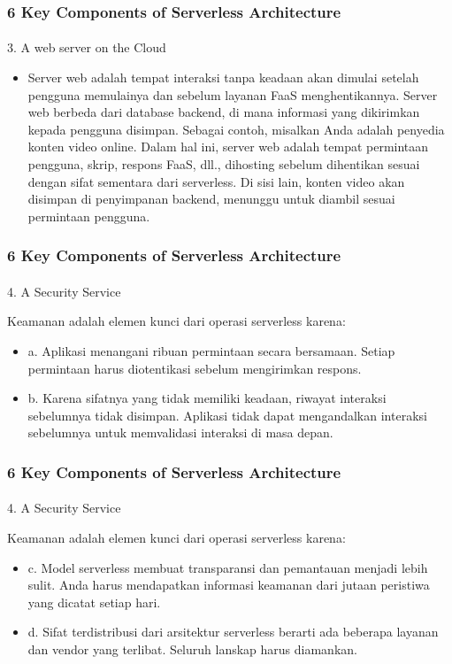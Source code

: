 \documentclass[aspectratio=169, table]{beamer}
\begin{document}
	\begin{frame}\frametitle{6 Key Components of Serverless Architecture}
			\framesubtitle{\hspace{1cm}}
		3. A web server on the Cloud
		\begin{itemize}
			\item Server web adalah tempat interaksi tanpa keadaan akan dimulai setelah pengguna memulainya dan sebelum layanan FaaS menghentikannya.
			Server web berbeda dari database backend, di mana informasi yang dikirimkan kepada pengguna disimpan. Sebagai contoh, misalkan Anda adalah penyedia konten video online.
			Dalam hal ini, server web adalah tempat permintaan pengguna, skrip, respons FaaS, dll., dihosting sebelum dihentikan sesuai dengan sifat sementara dari serverless.
			Di sisi lain, konten video akan disimpan di penyimpanan backend, menunggu untuk diambil sesuai permintaan pengguna.
		\end{itemize}
	\end{frame}

	\begin{frame}\frametitle{6 Key Components of Serverless Architecture}
			\framesubtitle{\hspace{1cm}}
		4. A Security Service

		Keamanan adalah elemen kunci dari operasi serverless karena:
		\begin{itemize}
			\item a. Aplikasi menangani ribuan permintaan secara bersamaan. Setiap permintaan harus diotentikasi sebelum mengirimkan respons.
			\item b. Karena sifatnya yang tidak memiliki keadaan, riwayat interaksi sebelumnya tidak disimpan. Aplikasi tidak dapat mengandalkan interaksi sebelumnya untuk memvalidasi interaksi di masa depan.


		\end{itemize}
	\end{frame}

		\begin{frame}\frametitle{6 Key Components of Serverless Architecture}
			\framesubtitle{\hspace{1cm}}
		4. A Security Service

		Keamanan adalah elemen kunci dari operasi serverless karena:
		\begin{itemize}
			\item c. Model serverless membuat transparansi dan pemantauan menjadi lebih sulit. Anda harus mendapatkan informasi keamanan dari jutaan peristiwa yang dicatat setiap hari.
			\item d. Sifat terdistribusi dari arsitektur serverless berarti ada beberapa layanan dan vendor yang terlibat. Seluruh lanskap harus diamankan.

		\end{itemize}
	\end{frame}
\end{document}
